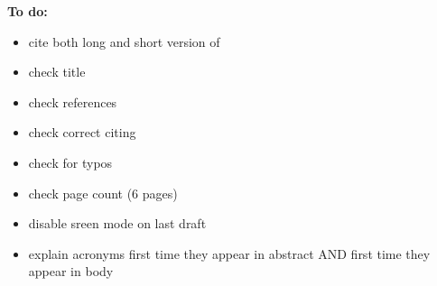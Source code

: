 \vspace{2em}
\textbf{\large To do:}
\vspace{1em}
\begin{itemize}[leftmargin=10pt]
	\item cite both long and short version of \cite{zen:statistical}
	\item check title
	\item check references
	\item check correct citing
	\item check for typos
	\item check page count (6 pages)
	\item disable sreen mode on last draft
	\item explain acronyms first time they appear in abstract AND first time they appear in body
\end{itemize}

\iffalse
\vspace{2em}
\textbf{\large Open points:}
\vspace{1em}
\begin{itemize}[leftmargin=10pt]
	\item Improvements of deep learning in speech synthesis also about voice quality. Does that make sense in this context?
	\item Where the focus of this paper should be (deep learning / speech synthesis / embedded devices)? Most papers are available for:
	\begin{itemize}
		\item deep learning <---> speech synthesis
		\item deep learning <---> embedded devices
	\end{itemize}
	\item Where to go into technical detail? Suggestion: One way of improving speech synthesis with deep learning.
	\item Core paper on \ac{SPSS} \cite{zen:statistical} available in two versions (4 and 23 pages). Which one to use as core paper? Suggestion: 4 page version as core paper and 23 page version as reference.
	\item Connection between the improvements of deep learning on speech synthesis (Section~\ref{subsec:deepspeech}) and the implementation of speech synthesis with/without deep learning (Section~\ref{sec:embeddedspeech})?
	\item Strictly spoken a smartphone/tablet is not an "embedded" device. Is some form of further declaration necessary in this context?
\end{itemize}
\fi

